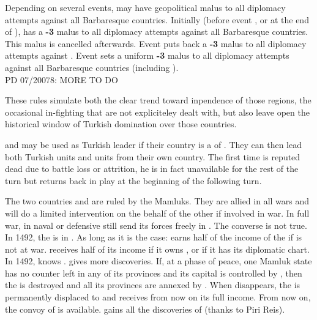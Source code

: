 Depending on several events, \TUR may have geopolitical malus to all
diplomacy attempts against all Barbaresque countries.
\bparag Initially (before event , or  at the end of
), \TUR has a {\bf -3} malus to all diplomacy attempts
against all Barbaresque countries.  This malus is cancelled afterwards.
\bparag Event  puts back a {\bf -3} malus to all
diplomacy attempts against .
\bparag Event  sets a uniform {\bf -3} malus
to all diplomacy attempts against all Barbaresque countries (including
).
\\
PD 07/20078: MORE TO DO
\begin{designnote}
These rules simulate both the clear trend toward inpendence of those regions,
the occasional in-fighting that are not expliciteley dealt with, but also leave
open the historical window of Turkish domination over those countries. 
\end{designnote}

 and  may be used as Turkish leader if
their country is a \VASSAL of \TUR. They can then lead both Turkish
units and units from their own country.
 The first time  is
reputed dead due to battle loss or attrition, he is in fact unavailable
for the rest of the turn but returns back in play at the beginning of
the following turn.

\label{chSpecific:Mamluks}
\aparag The two countries  and  are ruled by
the Mamluks. They are allied in all wars and will do a limited intervention
on the behalf of the other if involved in war.
\bparag In full war,  in naval or defensive
still send its forces freely in . The converse is not true.
 In 1492, the  is in
. As long as it is the case:
\bparag \VEN earns half of the income of the  if
 is not at war.
\bparag \TUR receives half of its income if it owns , or if
it has  its diplomatic chart.
\bparag In 1492,  knows
.  gives more
discoveries.
 If, at a phase of peace, one Mamluk state
has no \ARMY counter left in any of its provinces and its capital is
controlled by \TUR, then the \MIN is destroyed and all its provinces are
annexed by \TUR.
\bparag When  disappears, the  is
permanently displaced to  and \TUR receives from now on
its full income. From now on, the convoy of  is available.
\TUR gains all the discoveries of  (thanks to Piri Reis).

